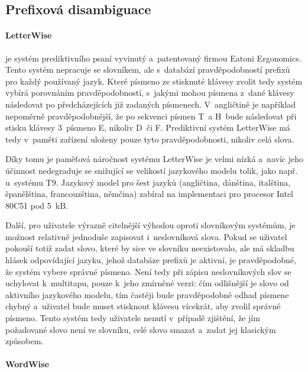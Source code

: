 \documentclass[a4paper,11pt,openany]{book} %
\begin{document}
\subsection{Prefixová disambiguace}

\paragraph{LetterWise}

je systém prediktivního psaní vyvinutý a~patentovaný firmou Eatoni Ergonomics. Tento systém nepracuje se slovníkem, ale s~databází pravděpodobností prefixů pro každý používaný jazyk. Které písmeno ze stisknuté klávesy zvolit tedy systém vybírá porovnáním pravděpodobností, s~jakými mohou písmena z~dané klávesy následovat po předcházejících již zadaných písmenech. V~angličtině je například nepoměrně pravděpodobnější, že po sekvenci písmen T~a H~bude následovat při stisku klávesy 3~písmeno E, nikoliv D~či F. Prediktivní systém LetterWise má tedy v~paměti zařízení uloženy pouze tyto pravděpodobnosti, nikoliv celá slova. \parencite{MacKenzie2001}

Díky tomu je paměťová náročnost systému LetterWise je velmi nízká a~navíc jeho účinnost nedegraduje se snižující se velikostí jazykového modelu tolik, jako např. u~systému T9. Jazykový model pro šest jazyků (angličtina, dánština, italština, španělština, francouzština, němčina) zabíral na implementaci pro procesor Intel 80C51 pod 5~kB. \parencite{eatoniletterwisereq} %

Další, pro uživatele výrazně citelnější výhodou oproti slovníkovým systémům, je možnost relativně jednoduše zapisovat i~neslovníková slova. Pokud se uživatel pokouší totiž zadat slovo, které by sice ve slovníku neexistovalo, ale má skladbu hlásek odpovídající jazyku, jehož databáze prefixů je aktivní, je pravděpodobné, že systém vybere správné písmeno. Není tedy při zápisu neslovníkových slov se uchylovat k~multitapu, pouze k~jeho zmírněné verzi: čím odlišnější je slovo od aktivního jazykového modelu, tím častěji bude pravděpodobně odhad písmene chybný a~uživatel bude muset stisknout klávesu vícekrát, aby zvolil správné písmeno. Tento systém tedy uživatele nenutí v~případě zjištění, že jím požadované slovo není ve slovníku, celé slovo smazat a~zadat jej klasickým způsobem. \parencite[5234]{ghayoomi2009overview} \parencite[112]{MacKenzie2001} 

\paragraph{WordWise}
\end{document}
